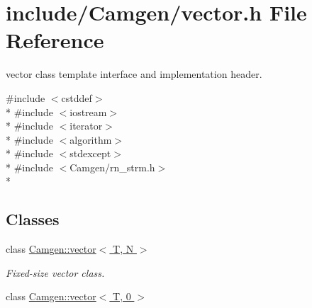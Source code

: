 \hypertarget{a00804}{\section{include/\-Camgen/vector.h File Reference}
\label{a00804}
}


vector class template interface and implementation header.  


{\ttfamily \#include $<$cstddef$>$}\\*
{\ttfamily \#include $<$iostream$>$}\\*
{\ttfamily \#include $<$iterator$>$}\\*
{\ttfamily \#include $<$algorithm$>$}\\*
{\ttfamily \#include $<$stdexcept$>$}\\*
{\ttfamily \#include $<$Camgen/rn\-\_\-strm.\-h$>$}\\*
\subsection*{Classes}
\begin{DoxyCompactItemize}
\item 
class \hyperlink{a00559}{Camgen\-::vector$<$ T, N $>$}
\begin{DoxyCompactList}\small\item\em Fixed-\/size vector class. \end{DoxyCompactList}\item 
class \hyperlink{a00560}{Camgen\-::vector$<$ T, 0 $>$}
\end{DoxyCompactItemize}
